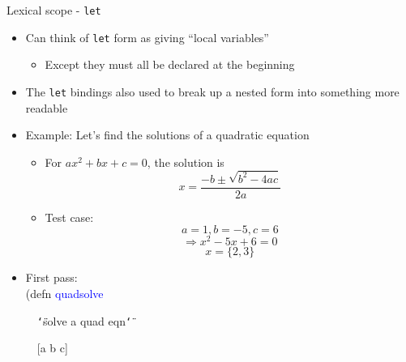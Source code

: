 \documentclass{beamer}
\renewcommand{\textquotedbl}{\texttt{\char`\"}}
\begin{document}
\begin{frame}[allowframebreaks]{Lexical scope - \texttt{let}}
  \begin{itemize}
  \item Can think of \texttt{let} form as giving ``local variables''
    \begin{itemize}
    \item Except they must all be declared at the beginning
    \end{itemize}
  \item The \texttt{let} bindings also used to break up a nested
    form into something more readable
  \item Example: Let's find the solutions of a quadratic equation
    \begin{itemize}
    \item For $ax^2 + bx + c = 0$, the solution is
\[x = \frac{-b \pm \sqrt{b^2 -4ac}}{2a}\]
    \item Test case:
\[a=1, b=-5, c=6\]
\[\Rightarrow x^2-5x+6 = 0\]
\[x=\lbrace2,3\rbrace\]
    \end{itemize}

    \framebreak
  \item First pass:\\
{\ttfamily\color{black}
%
\textcolor[rgb]{0.54901963,0.54901963,0.54901963}{(}\textcolor[rgb]{0.49803922,0.0,0.49803922}{defn}
\textcolor{blue}{quadsolve}}

{\ttfamily\color{black}
\ \ \textcolor[rgb]{0.54509807,0.13333334,0.32156864}{{\textquotedbl}solve
a quad eqn{\textquotedbl}}}

{\ttfamily\color{black}
\ \ [a b c]}


\end{itemize}
\end{frame}
\end{document}
